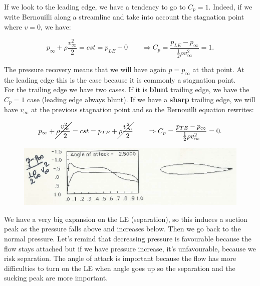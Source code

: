 			If we look to the leading edge, we have a tendency to go to $C_p = 1$. Indeed, if we write Bernouilli along a streamline and take into account the stagnation point where $v=0$, we have:
			
			\begin{equation}
			p_\infty + \rho \frac{v_\infty ^2}{2} = cst = p_{LE} + 0 \qquad \Rightarrow C_p = \frac{p_{LE}-p_\infty}{\frac{1}{2}\rho v_\infty ^2} = 1.
			\end{equation}						
			
			The pressure recovery means that we will have again $p = p_\infty$ at that point. At the leading edge this is the case because it is commonly a stagnation point. \\ 

For the trailing edge we have two cases. If it is \textbf{blunt} trailing edge, we have the $C_p = 1$ case (leading edge always blunt). If we have a \textbf{sharp} trailing edge, we will have $v_\infty$ at the previous stagnation point and so the Bernouilli equation rewrites:

			\begin{equation}
			p_\infty + \cancel{\rho \frac{v_\infty ^2}{2}} = cst = p_{TE} + \cancel{\rho \frac{v_\infty ^2}{2}} \qquad \Rightarrow C_p = \frac{p_{TE}-p_\infty}{\frac{1}{2}\rho v_\infty ^2} = 0.
			\end{equation}
			
			\begin{figure}
			\vspace{-5mm}
			\includegraphics[scale=0.4]{ch2/5}
			\end{figure}
			We have a very big expansion on the LE (separation), so this induces a suction peak as the pressure falls above and increases below. Then we go back to the normal pressure. Let’s remind that decreasing pressure is favourable because the flow stays attached but if we have pressure increase, it's unfavourable, because we risk separation.
The angle of attack is important because the flow has more difficulties to turn on the LE  when angle goes up so the separation and the sucking peak are more important.\\

